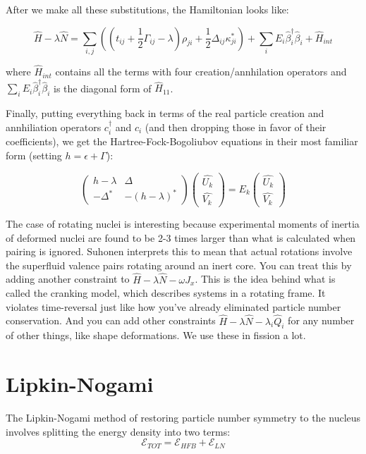 After we make all these substitutions, the Hamiltonian looks like:

\begin{equation}
\hat{H}-\lambda\hat{N} = \sum\limits_{i,j}\left(\left(t_{ij} + \frac{1}{2}\Gamma_{ij} - \lambda \right) \rho_{ji} + \frac{1}{2}\Delta_{ij}\kappa_{ji}^* \right) + \sum_{i}E_i \hat{\beta}_i^\dagger\hat{\beta}_i + \hat{H}_{int}
\end{equation}

\noindent where $\hat{H}_{int}$ contains all the terms with four creation/annhilation operators and $\sum_{i}E_i \hat{\beta}_i^\dagger\hat{\beta}_i$ is the diagonal form of $\hat{H}_{11}$.

Finally, putting everything back in terms of the real particle creation and annhiliation operators $c_i^\dagger$ and $c_i$ (and then dropping those in favor of their coefficients), we get the Hartree-Fock-Bogoliubov equations in their most familiar form (setting $h=\epsilon+\Gamma$):

\begin{equation}
\left(\begin{array}{cc}
h-\lambda & \Delta \\
-\Delta^* & -(h-\lambda)^*
\end{array}\right) \left(\begin{array}{c}
\hat{U_k} \\
\hat{V_k}
\end{array}\right)
= E_k\left(\begin{array}{c}
\hat{U_k} \\
\hat{V_k}
\end{array}\right)
\end{equation}

The case of rotating nuclei is interesting because experimental moments of inertia of deformed nuclei are found to be 2-3 times larger than what is calculated when pairing is ignored. Suhonen interprets this to mean that actual rotations involve the superfluid valence pairs rotating around an inert core. You can treat this by adding another constraint to $\hat{H} - \lambda\hat{N} - \omega J_x$. This is the idea behind what is called the cranking model, which describes systems in a rotating frame. It violates time-reversal just like how you've already eliminated particle number conservation. And you can add other constraints $\hat{H} - \lambda\hat{N} - \lambda_i \hat{Q}_i$ for any number of other things, like shape deformations. We use these in fission a lot.

\section*{Lipkin-Nogami}
The Lipkin-Nogami method of restoring particle number symmetry to the nucleus involves splitting the energy density into two terms:
\begin{equation*}
\mathcal{E}_{TOT} = \mathcal{E}_{HFB} + \mathcal{E}_{LN}
\end{equation*}

